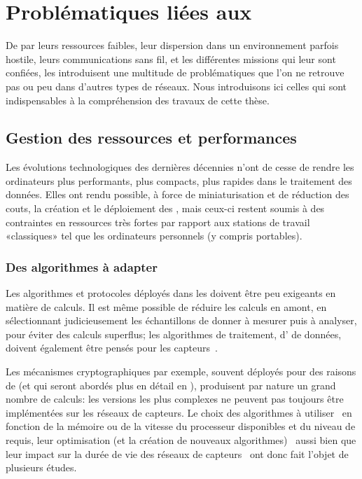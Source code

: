 \section{Problématiques liées aux \rcs}

De par leurs ressources faibles, leur dispersion dans un environnement parfois hostile, leurs communications sans fil, et les différentes missions qui leur sont confiées, les \rcsfs introduisent une multitude de problématiques que l'on ne retrouve pas ou peu dans d'autres types de réseaux.
Nous introduisons ici celles qui sont indispensables à la compréhension des travaux de cette thèse.

    \subsection{Gestion des ressources et performances}
Les évolutions technologiques des dernières décennies n'ont de cesse de rendre les ordinateurs plus performants, plus compacts, plus rapides dans le traitement des données.
Elles ont rendu possible, à force de miniaturisation et de réduction des couts, la création et le déploiement des \rcsfs, mais ceux-ci restent soumis à des contraintes en ressources très fortes par rapport aux stations de travail «classiques» tel que les ordinateurs personnels (y compris portables).

        \subsubsection{Des algorithmes à adapter}
Les algorithmes et protocoles déployés dans les \rcs doivent être peu exigeants en matière de calculs.
Il est même possible de réduire les calculs en amont, en sélectionnant judicieusement les échantillons de donner à mesurer puis à analyser, pour éviter des calculs superflus; les algorithmes de traitement, d' de données, doivent également être pensés pour les capteurs~\cite{ACFP09}.

Les mécanismes cryptographiques par exemple, souvent déployés pour des raisons de \secu (et qui seront abordés plus en détail en ), produisent par nature un grand nombre de calculs: les versions les plus complexes ne peuvent pas toujours être implémentées sur les réseaux de capteurs.
Le choix des algorithmes à utiliser~\cite{LDH06} en fonction de la mémoire ou de la vitesse du processeur disponibles et du niveau de \secu requis, leur optimisation (et la création de nouveaux algorithmes)~\cite{GNL12} aussi bien que leur impact sur la durée de vie des réseaux de capteurs~\cite{PLP06} ont donc fait l'objet de plusieurs études.

